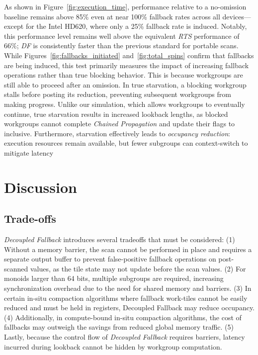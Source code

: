 \documentclass[acmsmall, manuscript, screen, review, anonymous]{acmart}
\begin{document}
As shown in Figure~\ref{fig:execution_time}, performance relative to a no-omission baseline remains above 85\% even at near 100\% fallback rates across all devices---except for the Intel HD620, where only a 25\% fallback rate is induced. Notably, this performance level remains well above the equivalent \emph{RTS} performance of 66\%; \emph{DF} is consistently faster than the previous standard for portable scans. While Figures~\ref{fig:fallbacks_initiated} and~\ref{fig:total_spins} confirm that fallbacks are being induced, this test primarily measures the impact of increasing fallback operations rather than true blocking behavior. This is because workgroups are still able to proceed after an omission. In true starvation, a blocking workgroup stalls before posting its reduction, preventing subsequent workgroups from making progress. Unlike our simulation, which allows workgroups to eventually continue, true starvation results in increased lookback lengths, as blocked workgroups cannot complete \emph{Chained Propagation} and update their flags to inclusive. Furthermore, starvation effectively leads to \emph{occupancy reduction}: execution resources remain available, but fewer subgroups can context-switch to mitigate latency
\section{Discussion}

\subsection{Trade-offs}
\emph{Decoupled Fallback} introduces several tradeoffs that must be considered: (1) Without a memory barrier, the scan cannot be performed in place and requires a separate output buffer to prevent false-positive fallback operations on post-scanned values, as the tile state may not update before the scan values. (2) For monoids larger than 64 bits, multiple subgroups are required, increasing synchronization overhead due to the need for shared memory and barriers. (3) In certain in-situ compaction algorithms where fallback work-tiles cannot be easily reduced and must be held in registers, Decoupled Fallback may reduce occupancy. (4) Additionally, in compute-bound in-situ compaction algorithms, the cost of fallbacks may outweigh the savings from reduced global memory traffic. (5) Lastly, because the control flow of \emph{Decoupled Fallback} requires barriers, latency incurred during lookback cannot be hidden by workgroup computation.
\end{document}
